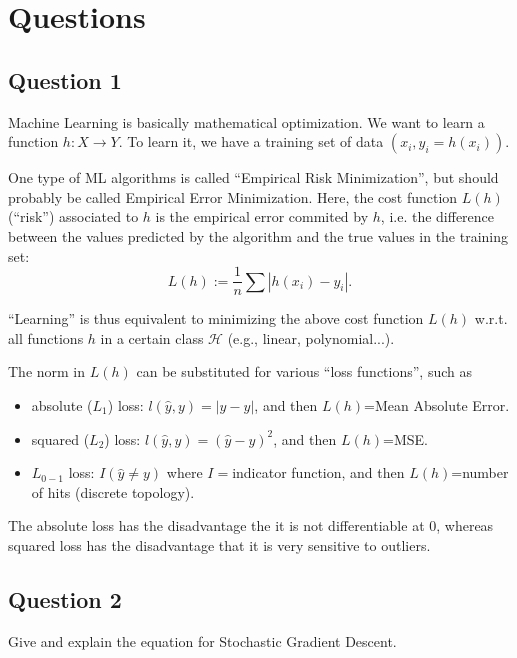 \documentclass{article}
\begin{document}
\maketitle

\section{Questions}

\subsection*{Question 1}

Machine Learning is basically mathematical optimization. We want to learn a
function $h:X\to Y$. To learn it, we have a training set of data
$(x_i,y_i=h(x_i))$.

One type of ML algorithms is called ``Empirical Risk Minimization'', but should
probably be called Empirical Error Minimization. 
Here, the cost function $L(h)$ (``risk'') associated to $h$ is the empirical error
commited by $h$, i.e. the difference between the values predicted by the
algorithm and the true values in the training set:
\[ L(h) := \frac{1}{n} \sum |h(x_i)-y_i|. \]

``Learning'' is thus equivalent to minimizing the above cost function $L(h)$
w.r.t. all functions $h$ in a certain class $\mathcal{H}$ (e.g., linear,
polynomial...).

The norm in $L(h)$ can be substituted for various ``loss functions'',
such as 
\begin{itemize}
\item absolute ($L_1$) loss: $l(\hat y, y)= |\hat y-y|$, and then $L(h)$=Mean
Absolute Error.
\item squared ($L_2$) loss: $l(\hat y, y)= (\hat y-y)^2$, and then $L(h)$=MSE.
\item $L_{0-1}$ loss: $I(\hat y \neq y)$ where $I=$indicator function, and then
$L(h)$=number of hits (discrete topology).
\end{itemize}

The absolute loss has the disadvantage the it is not differentiable at $0$,
whereas squared loss has the disadvantage that it is very sensitive to
outliers.

\subsection*{Question 2} 

Give and explain the equation for Stochastic Gradient Descent.
\end{document}
